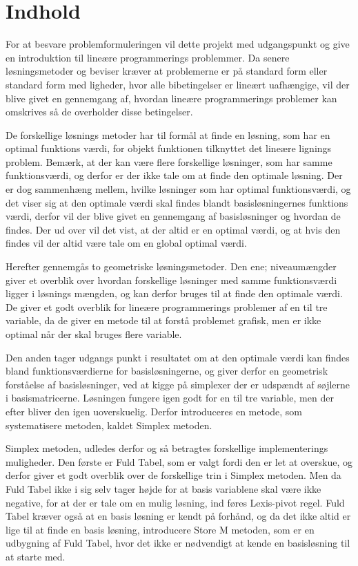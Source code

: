 \section{Indhold}
For at besvare problemformuleringen vil dette projekt med udgangspunkt \cite{bert} og \cite{lay} give en introduktion til lineære programmerings problemmer.
Da senere løsningsmetoder og beviser kræver at problemerne er på standard form eller standard form med ligheder, hvor alle bibetingelser er 
lineært uafhængige, vil der blive givet en gennemgang af, hvordan lineære programmerings problemer kan omskrives så de overholder disse betingelser.

De forskellige løsnings metoder har til formål at finde en løsning, som har en optimal funktions værdi, for objekt funktionen tilknyttet det lineære
lignings problem.
Bemærk, at der kan være flere forskellige løsninger, som har samme funktionsværdi, og derfor er der ikke tale om at finde den optimale løsning. 
Der er dog sammenhæng mellem, hvilke løsninger som har optimal funktionsværdi, og det viser sig at den optimale værdi skal findes blandt basisløsningernes
funktions værdi, derfor vil der blive givet en gennemgang af basisløsninger og hvordan de findes.
Der ud over vil det vist, at der altid er en optimal værdi, og at hvis den findes vil der altid være tale om en global optimal værdi.

Herefter gennemgås to geometriske løsningsmetoder.
Den ene; niveaumængder giver et overblik over hvordan forskellige løsninger med samme funktionsværdi ligger i løsnings mængden, og kan derfor bruges til 
at finde den optimale værdi. 
De giver et godt overblik for lineære programmerings problemer af en til tre variable, da de giver en metode til at forstå problemet grafisk, men 
er ikke optimal når der skal bruges flere variable.

Den anden tager udgangs punkt i resultatet om at den optimale værdi kan findes bland funktionsværdierne for basisløsningerne, og giver derfor en geometrisk
forståelse af basisløsninger, ved at kigge på simplexer der er udspændt af søjlerne i basismatricerne.
Løsningen fungere igen godt for en til tre variable, men der efter bliver den igen uoverskuelig.
Derfor introduceres en metode, som systematisere metoden, kaldet Simplex metoden.

Simplex metoden, udledes derfor og så betragtes forskellige implementerings muligheder.
Den første er Fuld Tabel, som er valgt fordi den er let at overskue, og derfor giver et godt overblik over de forskellige trin i Simplex metoden.
Men da Fuld Tabel ikke i sig selv tager højde for at basis variablene skal være ikke negative, for at der er tale om en mulig løsning, ind føres Lexis-pivot regel.
Fuld Tabel kræver også at en basis løsning er kendt på forhånd, og da det ikke altid er lige til at finde en basis løsning, introducere Store M metoden,
som er en udbygning af Fuld Tabel, hvor det ikke er nødvendigt at kende en basisløsning til at starte med.

